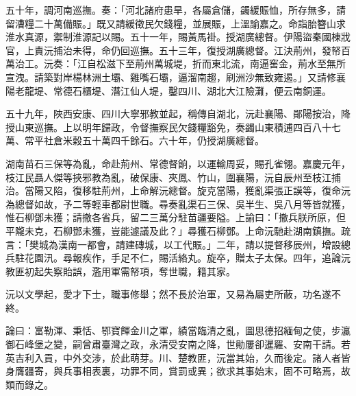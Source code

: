 \begin{pinyinscope}
五十年，調河南巡撫。奏：「河北諸府患旱，各屬倉儲，蠲緩賑恤，所存無多，請留漕糧二十萬備賑。」既又請緩徵民欠錢糧，並展賑，上溫諭嘉之。命詣胎簪山求淮水真源，禦制淮源記以賜。五十一年，賜黃馬褂。授湖廣總督。伊陽盜秦國棟戕官，上責沅捕治未得，命仍回巡撫。五十三年，復授湖廣總督。江決荊州，發帑百萬治工。沅奏：「江自松滋下至荊州萬城堤，折而東北流，南逼窖金，荊水至無所宣洩。請築對岸楊林洲土壩、雞嘴石壩，逼溜南趨，刷洲沙無致雍遏。」又請修襄陽老龍堤、常德石櫃堤、潛江仙人堤，鑿四川、湖北大江險灘，便云南銅運。

五十九年，陜西安康、四川大寧邪教並起，稱傳自湖北，沅赴襄陽、鄖陽按治，降授山東巡撫。上以明年歸政，令督撫察民欠錢糧豁免，奏蠲山東積逋四百八十七萬、常平社倉米穀五十萬四千餘石。六十年，仍授湖廣總督。

湖南苗石三保等為亂，命赴荊州、常德督餉，以運輸周妥，賜孔雀翎。嘉慶元年，枝江民聶人傑等挾邪教為亂，破保康、夾鳳、竹山，圍襄陽，沅自辰州至枝江捕治。當陽又陷，復移駐荊州，上命解沅總督。旋克當陽，獲亂渠張正謨等，復命沅為總督如故，予二等輕車都尉世職。尋奏亂渠石三保、吳半生、吳八月等皆就獲，惟石柳鄧未獲；請撤各省兵，留二三萬分駐苗疆要隘。上諭曰：「撤兵朕所原，但平隴未克，石柳鄧未獲，豈能遽議及此？」尋獲石柳鄧。上命沅馳赴湖南鎮撫。疏言：「樊城為漢南一都會，請建磚城，以工代賑。」二年，請以提督移辰州，增設總兵駐花園汛。尋報疾作，手足不仁，賜活絡丸。旋卒，贈太子太保。四年，追論沅教匪初起失察貽誤，濫用軍需帑項，奪世職，籍其家。

沅以文學起，愛才下士，職事修舉；然不長於治軍，又易為屬吏所蔽，功名遂不終。

論曰：富勒渾、秉恬、鄂寶餫金川之軍，績當臨清之亂，圖思德招緬甸之使，步瀛御石峰堡之變，嗣曾肅臺灣之政，永清受安南之降，世勛屢卻暹羅、安南干請。若英吉利入貢，中外交涉，於此萌芽。川、楚教匪，沅當其始，久而後定。諸人者皆身膺疆寄，與兵事相表裏，功罪不同，賞罰或異；欲求其事始末，固不可略焉，故類而錄之。


\end{pinyinscope}